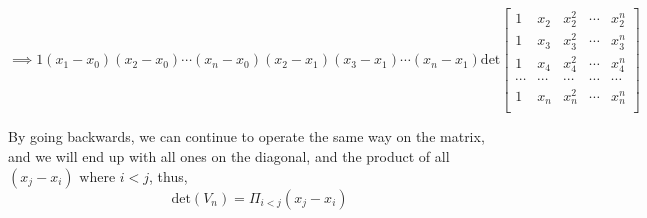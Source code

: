 \documentclass[letterpaper,12pt]{article}
\theoremstyle{definition}
\begin{document}
\[
\implies
1(x_1-x_0)(x_2-x_0)\cdots(x_n - x_0)(x_2 -x_1)(x_3 - x_1) \cdots (x_n - x_1)\text{det}
\begin{bmatrix}
    1 & x_2 & x_2^2 &\cdots &x_2^n\\
    1 & x_3 & x_3^2 &\cdots &x_3^n\\
    1 & x_4 & x_4^2 &\cdots &x_4^n\\
    \cdots&\cdots&\cdots &\cdots &\cdots\\
    1 & x_n & x_n^2 &\cdots &x_n^n\\
\end{bmatrix}
\]

By going backwards, we can continue to operate the same way on the matrix, and we will
end up with all ones on the diagonal, and the product of all $(x_j - x_i) \text{ where } i<j$, thus, 
\[\text{det}(V_n) = \Pi_{i<j} (x_j - x_i)\]
\end{document}

